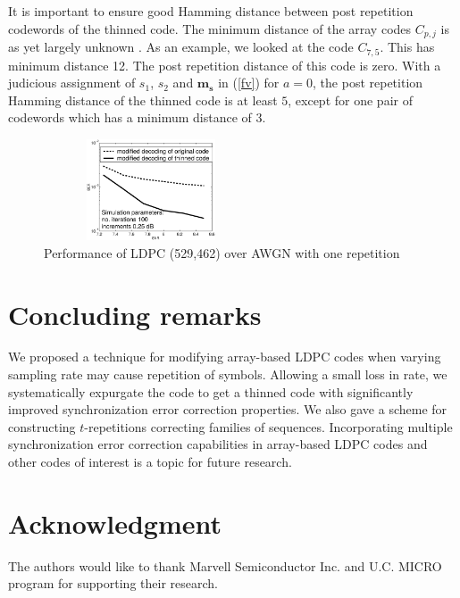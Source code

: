 It is important to ensure good Hamming distance between post
repetition codewords of the thinned code. The minimum distance of
the array codes $C_{p,j}$ is as yet largely unknown
\cite{mittel:02, yanghell:03}. As an example, we looked at the
code $C_{7,5}$. This has minimum distance 12. The post repetition
distance of this code is zero. With a judicious assignment of
$s_1$, $s_2$ and $\mathbf{m_s}$ in (\ref{fv}) for $a = 0$, the
post repetition Hamming distance of the thinned code is at least
$5$, except for one pair of codewords which has a minimum distance
of $3$.

\begin{figure}
\vspace{0.1in}\hspace{0.4in}\includegraphics[width=2.5in,height=1.18in]{fig233b.eps}
\caption{Performance of LDPC (529,462) over AWGN with one
repetition} \vspace{-0.05in}
\end{figure}



\section{Concluding remarks}
We proposed a technique for modifying array-based LDPC codes when
varying sampling rate may cause repetition of symbols. Allowing a
small loss in rate, we systematically expurgate the code to get a
thinned code with significantly improved synchronization error
correction properties. We also gave a scheme for constructing
$t$-repetitions correcting families of sequences. Incorporating
multiple synchronization error correction capabilities in
array-based LDPC codes and other codes of interest is a topic for
future research.


\vspace{-0.1in}
\section*{Acknowledgment}
The authors would like to thank Marvell Semiconductor Inc. and
U.C. MICRO program for supporting their research.



